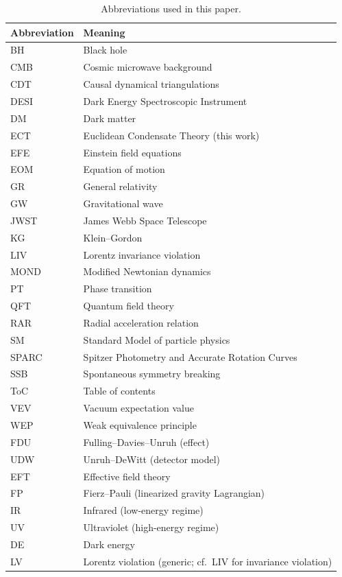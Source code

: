 \documentclass[11pt,a4paper]{article}
\numberwithin{equation}{section}
\begin{document}
\begin{longtable}{@{}p{2.8cm} p{12.2cm}@{}}
\caption{Abbreviations used in this paper.}
\label{tab:abbreviations}\\
\toprule
\textbf{Abbreviation} & \textbf{Meaning} \\
\midrule
\endhead
\bottomrule
\endfoot
BH & Black hole \\
CMB & Cosmic microwave background \\
CDT & Causal dynamical triangulations \\
DESI & Dark Energy Spectroscopic Instrument \\
DM & Dark matter \\
ECT & Euclidean Condensate Theory (this work) \\
EFE & Einstein field equations \\
EOM & Equation of motion \\
GR & General relativity \\
GW & Gravitational wave \\
JWST & James Webb Space Telescope \\
KG & Klein--Gordon \\
LIV & Lorentz invariance violation \\
MOND & Modified Newtonian dynamics \\
PT & Phase transition \\
QFT & Quantum field theory \\
RAR & Radial acceleration relation \\
SM & Standard Model of particle physics \\
SPARC & Spitzer Photometry and Accurate Rotation Curves \\
SSB & Spontaneous symmetry breaking \\
ToC & Table of contents \\
VEV & Vacuum expectation value \\
WEP & Weak equivalence principle \\
FDU & Fulling--Davies--Unruh (effect) \\
UDW & Unruh--DeWitt (detector model) \\
EFT & Effective field theory \\
FP & Fierz--Pauli (linearized gravity Lagrangian) \\
IR & Infrared (low-energy regime) \\
UV & Ultraviolet (high-energy regime) \\
DE & Dark energy \\
LV & Lorentz violation (generic; cf.\ LIV for invariance violation) \\
\end{longtable}
\end{document}
